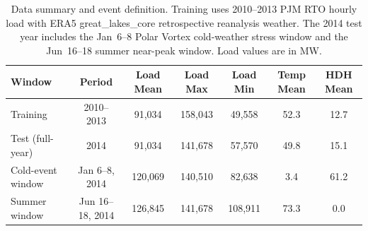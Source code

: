 \begin{table}[htbp]
\centering
\caption{Data summary and event definition. Training uses 2010--2013 PJM RTO hourly load with ERA5 great\_lakes\_core retrospective reanalysis weather. The 2014 test year includes the Jan~6--8 Polar Vortex cold-weather stress window and the Jun~16--18 summer near-peak window. Load values are in MW.}
\label{tab:data_summary}
\begin{tabular}{lcccccc}
\toprule
Window & Period & Load Mean & Load Max & Load Min & Temp Mean & HDH Mean \\
\midrule
Training & 2010--2013 & 91,034 & 158,043 & 49,558 & 52.3 & 12.7 \\
Test (full-year) & 2014 & 91,034 & 141,678 & 57,570 & 49.8 & 15.1 \\
Cold-event window & Jan 6--8, 2014 & 120,069 & 140,510 & 82,638 & 3.4 & 61.2 \\
Summer window & Jun 16--18, 2014 & 126,845 & 141,678 & 108,911 & 73.3 & 0.0 \\
\bottomrule
\end{tabular}
\end{table}